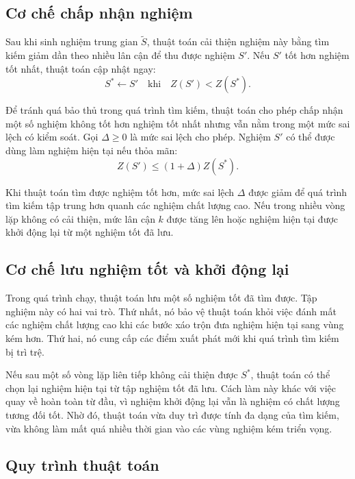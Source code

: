 \subsection{Cơ chế chấp nhận nghiệm}

Sau khi sinh nghiệm trung gian $\widetilde{S}$, thuật toán cải thiện nghiệm này bằng tìm kiếm giảm dần theo nhiều lân cận để thu được nghiệm $S'$. Nếu $S'$ tốt hơn nghiệm tốt nhất, thuật toán cập nhật ngay:
\begin{equation}
    S^* \leftarrow S' \quad \text{khi} \quad Z(S') < Z(S^*).
    \label{eq:chapter3-vns-best-update}
\end{equation}

Để tránh quá bảo thủ trong quá trình tìm kiếm, thuật toán cho phép chấp nhận một số nghiệm không tốt hơn nghiệm tốt nhất nhưng vẫn nằm trong một mức sai lệch có kiểm soát. Gọi $\Delta \geq 0$ là mức sai lệch cho phép. Nghiệm $S'$ có thể được dùng làm nghiệm hiện tại nếu thỏa mãn:
\begin{equation}
    Z(S') \leq (1+\Delta)Z(S^*).
    \label{eq:chapter3-vns-acceptance}
\end{equation}

Khi thuật toán tìm được nghiệm tốt hơn, mức sai lệch $\Delta$ được giảm để quá trình tìm kiếm tập trung hơn quanh các nghiệm chất lượng cao. Nếu trong nhiều vòng lặp không có cải thiện, mức lân cận $k$ được tăng lên hoặc nghiệm hiện tại được khởi động lại từ một nghiệm tốt đã lưu.

\subsection{Cơ chế lưu nghiệm tốt và khởi động lại}

Trong quá trình chạy, thuật toán lưu một số nghiệm tốt đã tìm được. Tập nghiệm này có hai vai trò. Thứ nhất, nó bảo vệ thuật toán khỏi việc đánh mất các nghiệm chất lượng cao khi các bước xáo trộn đưa nghiệm hiện tại sang vùng kém hơn. Thứ hai, nó cung cấp các điểm xuất phát mới khi quá trình tìm kiếm bị trì trệ.

Nếu sau một số vòng lặp liên tiếp không cải thiện được $S^*$, thuật toán có thể chọn lại nghiệm hiện tại từ tập nghiệm tốt đã lưu. Cách làm này khác với việc quay về hoàn toàn từ đầu, vì nghiệm khởi động lại vẫn là nghiệm có chất lượng tương đối tốt. Nhờ đó, thuật toán vừa duy trì được tính đa dạng của tìm kiếm, vừa không làm mất quá nhiều thời gian vào các vùng nghiệm kém triển vọng.

\subsection{Quy trình thuật toán}


